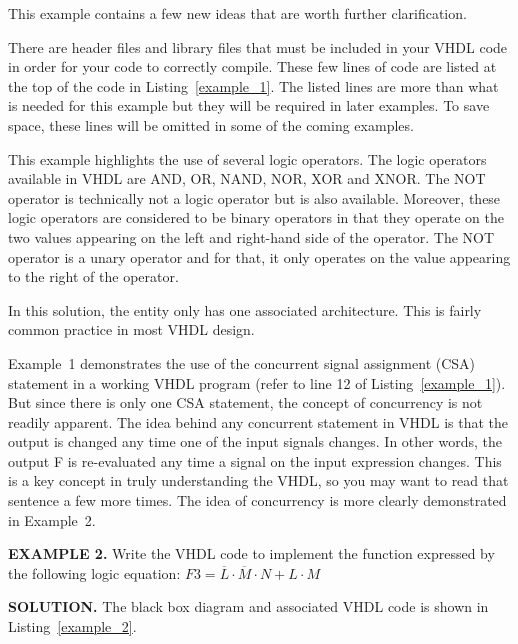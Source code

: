 This example contains a few new ideas that are worth further clarification.
\begin{my_list}
\item There are header files and library files that must be included in your VHDL code in order for your code to correctly compile. These few lines of code are listed at the top of the code in Listing~\ref{example_1}. The listed lines are more than what is needed for this example but they will be required in later examples. To save space, these lines will be omitted in some of the coming examples.
\item This example highlights the use of several logic operators. The logic operators available in VHDL are AND, OR, NAND, NOR, XOR and XNOR. The NOT operator is technically not a logic operator but is also available. Moreover, these logic operators are considered to be binary operators in that they operate on the two values appearing on the left and right-hand side of the operator. The NOT operator is a unary operator and for that, it only operates on the value appearing to the right of the operator.
\item In this solution, the entity only has one associated architecture. This is fairly common practice in most VHDL design.
\end{my_list}
Example~1 demonstrates the use of the concurrent signal assignment (CSA) statement in a working VHDL program (refer to line 12 of Listing~\ref{example_1}). But since there is only one CSA statement, the concept of concurrency is not readily apparent. The idea behind any concurrent statement in VHDL is that the output is changed any time one of the input signals changes. In other words, the output F is re-evaluated any time a signal on the input expression changes. This is a key concept in truly understanding the VHDL, so you may want to read that sentence a few more times. The idea of concurrency is more clearly demonstrated in Example~2.

\begin{leftbar}
\noindent
\textbf{EXAMPLE 2.}
Write the VHDL code to implement the function expressed by the following logic equation: $F3=\overline{L} \cdot \overline{M}\cdot N+L\cdot M$
\end{leftbar}
\noindent
\textbf{SOLUTION.} The black box diagram and associated VHDL code is shown in Listing~\ref{example_2}.

